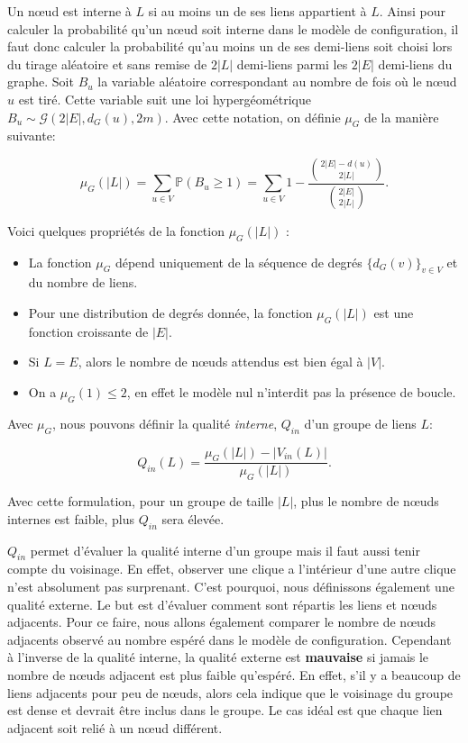 Un n\oe{}ud est interne à $L$ si au moins un de ses liens appartient à $L$.
Ainsi pour calculer la probabilité qu'un n\oe{}ud soit interne dans le modèle de configuration, il faut donc calculer la probabilité qu'au moins un de ses demi-liens soit choisi lors du tirage aléatoire et sans remise de $2|L|$ demi-liens parmi les $2|E|$ demi-liens du graphe.
Soit $B_u$ la variable aléatoire correspondant au nombre de fois où le n\oe{}ud $u$ est tiré.
Cette variable suit une loi  hypergéométrique $B_u \sim \mathcal{G}\left(2|E|,d_G(u),2m\right)$.
Avec cette notation, on définie $\mu_G$ de la manière suivante:

\begin{equation}
\label{eq:nbsommet_esp} \mu_{G}(|L|) = \sum_{u\in V} \mathbb{P}( B_u \geq 1 )
=  \sum_{u \in V} 1 - \dfrac{ \binom{2|E|-d(u)}{2|L|} }{ \binom{2|E|}{2|L|} }. 
\end{equation}

Voici quelques propriétés de la fonction $\mu_{G}(|L|)$ :
\begin{itemize}
\item La fonction $\mu_{G}$ dépend uniquement de la séquence de degrés $\{d_G(v)\}_{v \in V}$ et du nombre de liens.
\item Pour une distribution de degrés donnée, la fonction   $\mu_{G}(|L|)$ est une fonction croissante de $|E|$.
\item Si $L=E$, alors le nombre de n\oe{}uds attendus est bien égal à $|V|$.
\item On a $\mu_{G}(1)\leq 2$, en effet le modèle nul n'interdit pas la présence de boucle.
\end{itemize}

Avec $\mu_G$, nous pouvons définir la qualité \emph{interne}, $Q_{in}$ d'un groupe de liens $L$:
  
\begin{equation}
\label{eq:qin} Q_{in}(L) = \dfrac{\mu_{G}(|L|) - |V_{in}(L)|}{\mu_{G}(|L|)}.
\end{equation}

Avec cette formulation, pour un groupe de taille $|L|$, plus le nombre de n\oe{}uds internes est faible, plus $Q_{in}$ sera élevée.

$Q_{in}$ permet d'évaluer la qualité interne d'un groupe mais il faut aussi tenir compte du voisinage.
En effet, observer une clique a l'intérieur d'une autre clique n'est absolument pas surprenant.
C'est pourquoi, nous définissons également une qualité externe.
Le but est d'évaluer comment sont répartis les liens et n\oe{}uds adjacents.
Pour ce faire, nous allons également comparer le nombre de n\oe{}uds adjacents observé au nombre espéré dans le modèle de configuration.
Cependant à l'inverse de la qualité interne, la qualité externe est \textbf{mauvaise} si jamais le nombre de n\oe{}uds adjacent est plus faible qu'espéré.
En effet, s'il y a beaucoup de liens adjacents pour peu de n\oe{}uds, alors cela indique que le voisinage du groupe est dense et devrait être inclus dans le groupe.
Le cas idéal est que chaque lien adjacent soit relié à un n\oe{}ud différent.

